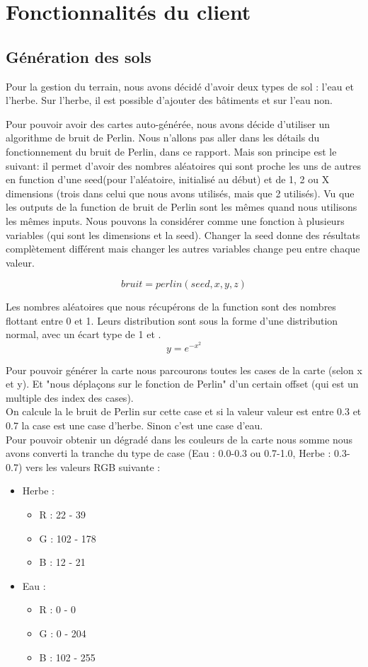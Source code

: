 \documentclass[a4paper,10pt,openany,oneside]{report}
\begin{document}
\section{Fonctionnalités du client}
\subsection{Génération des sols}
Pour la gestion du terrain, nous avons décidé d'avoir deux types de sol : l'eau et l'herbe. Sur l'herbe, il est possible d'ajouter des bâtiments et sur l'eau non.

Pour pouvoir avoir des cartes auto-générée, nous avons décide d'utiliser un algorithme de bruit de Perlin. Nous n'allons pas aller dans les détails du fonctionnement du bruit de Perlin, dans ce rapport. Mais son principe est le suivant: il permet d'avoir des nombres aléatoires qui sont proche les uns de autres en function d'une seed(pour l'aléatoire, initialisé au début) et de 1, 2 ou X dimensions (trois dans celui que nous avons utilisés, mais que 2 utilisés). Vu que les outputs de la function de bruit de Perlin sont les mêmes quand nous utilisons les mêmes inputs. Nous pouvons la considérer comme une fonction à plusieurs variables (qui sont les dimensions et la seed). Changer la seed donne des résultats complètement différent mais changer les autres variables change peu entre chaque valeur.

\[bruit = perlin(seed, x, y, z)\]

Les nombres aléatoires que nous récupérons de la function sont des nombres flottant entre 0 et 1.
Leurs distribution sont sous la forme d'une distribution normal, avec un écart type de 1 et .
\[y=e^{-x^{2}}\]

Pour pouvoir générer la carte nous parcourons toutes les cases de la carte (selon x et y). Et "nous déplaçons sur le fonction de Perlin" d'un certain offset (qui est un multiple des index des cases). \\
On calcule la le bruit de Perlin sur cette case et si la valeur valeur est entre 0.3 et 0.7 la case est une case d'herbe. Sinon c'est une case d'eau. \\
Pour pouvoir obtenir un dégradé dans les couleurs de la carte nous somme nous avons converti la tranche du type de case (Eau : 0.0-0.3 ou 0.7-1.0, Herbe : 0.3-0.7) vers les valeurs RGB suivante :
\begin{itemize}
	\item Herbe :
	\begin{itemize}
		\item R : 22 - 39
		\item G : 102 - 178
		\item B : 12 - 21
	\end{itemize}
	\item Eau :
	\begin{itemize}
		\item R : 0 - 0
		\item G : 0 - 204
		\item B : 102 - 255
	\end{itemize}
\end{itemize}
\end{document}
